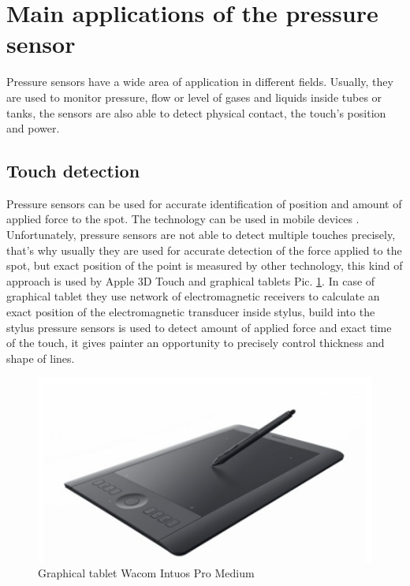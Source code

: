 \documentclass[english]{article}
\begin{document}
\section{Main applications of the pressure sensor}

Pressure sensors have a wide area of application in different fields. Usually, they are used to monitor pressure, flow or level of gases and liquids inside tubes or tanks, the sensors are also able to detect physical contact, the touch's position and power. \cite{inf}

\subsection{Touch detection}

Pressure sensors can be used for accurate identification of position and amount of applied force to the spot. The technology can be used in mobile devices \cite{touch}. Unfortunately, pressure sensors are not able to detect multiple touches precisely, that's why usually they are used for accurate detection of the force applied to the spot, but exact position of the point is measured by other technology, this kind of approach is used by Apple 3D Touch \cite{apple} and graphical tablets Pic. \ref{fig:wacom}. \cite{wacom} In case of graphical tablet they use network of electromagnetic receivers to calculate an exact position of the electromagnetic transducer inside stylus, build into the stylus pressure sensors is used to detect amount of applied force and exact time of the touch, it gives painter an opportunity to  precisely control thickness and shape of lines.

\begin{figure}
\centerline{\includegraphics[scale=0.5]{PressureSensors/wacom}}
\caption{Graphical tablet Wacom Intuos Pro Medium\label{fig:wacom} \cite{wacom}}
\end{figure}
\end{document}
